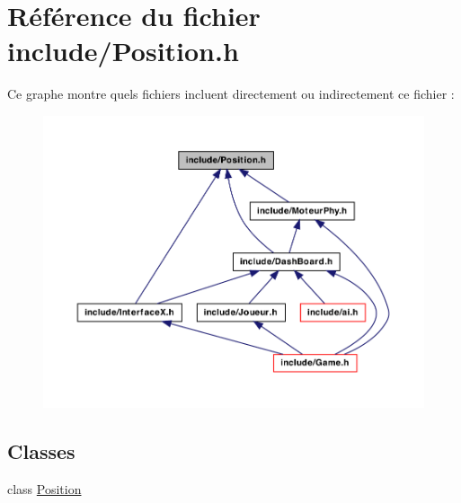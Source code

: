 \hypertarget{a00033}{
\section{Référence du fichier include/Position.h}
\label{a00033}
}
Ce graphe montre quels fichiers incluent directement ou indirectement ce fichier :
\nopagebreak
\begin{figure}[H]
\begin{center}
\leavevmode
\includegraphics[width=400pt]{a00066}
\end{center}
\end{figure}
\subsection*{Classes}
\begin{DoxyCompactItemize}
\item 
class \hyperlink{a00014}{Position}
\end{DoxyCompactItemize}
